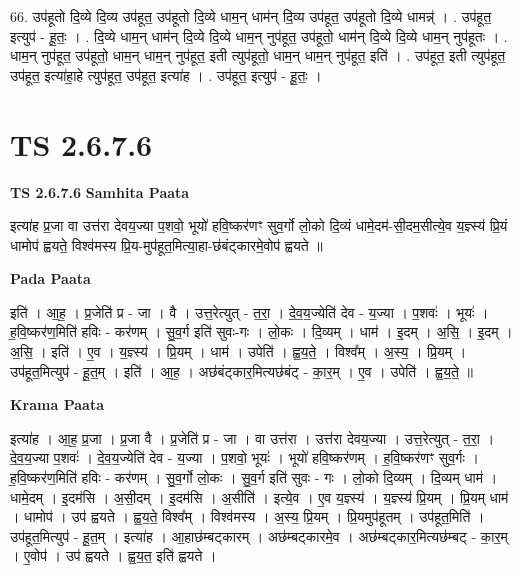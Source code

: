 \documentclass[17pt]{extarticle}
\begin{document}
66. उप॑हूतो दि॒व्ये दि॒व्य उप॑हूत॒ उप॑हूतो दि॒व्ये धाम॒न् धाम॑न् दि॒व्य उप॑हूत॒ उप॑हूतो दि॒व्ये धामन्न्॑ । . उप॑हूत॒ इत्युप॑ - हू॒तः॒ । . दि॒व्ये धाम॒न् धाम॑न् दि॒व्ये दि॒व्ये धाम॒न् नुप॑हूत॒ उप॑हूतो॒ धाम॑न् दि॒व्ये दि॒व्ये धाम॒न् नुप॑हूतः । . धाम॒न् नुप॑हूत॒ उप॑हूतो॒ धाम॒न् धाम॒न् नुप॑हूत॒ इती त्युप॑हूतो॒ धाम॒न् धाम॒न् नुप॑हूत॒ इति॑ । . उप॑हूत॒ इती त्युप॑हूत॒ उप॑हूत॒ इत्या॑हा॒हे त्युप॑हूत॒ उप॑हूत॒ इत्या॑ह । . उप॑हूत॒ इत्युप॑ - हू॒तः॒ । \newline
\pagebreak
{}

\section{ TS 2.6.7.6 }

\textbf{TS 2.6.7.6 } \newline
\textbf{Samhita Paata} \newline

इत्या॑ह प्र॒जा वा उत्त॑रा देवय॒ज्या प॒शवो॒ भूयो॑ हवि॒ष्कर॑णꣳ सुव॒र्गो लो॒को दि॒व्यं धामे॒दम॑-सी॒दम॒सीत्ये॒व य॒ज्ञ्स्य॑ प्रि॒यं धामोप॑ ह्वयते॒ विश्व॑मस्य प्रि॒य-मुप॑हूत॒मित्या॒हा-छ॑बंट्कारमे॒वोप॑ ह्वयते ॥ \newline

\textbf{Pada Paata} \newline

इति॑ । आ॒ह॒ । प्र॒जेति॑ प्र - जा । वै । उत्त॒रेत्युत् - त॒रा॒ । दे॒व॒य॒ज्येति॑ देव - य॒ज्या । प॒शवः॑ । भूयः॑ । ह॒वि॒ष्कर॑ण॒मिति॑ हविः - कर॑णम् । सु॒व॒र्ग इति॑ सुवः-गः । लो॒कः । दि॒व्यम् । धाम॑ । इ॒दम् । अ॒सि॒ । इ॒दम् । अ॒सि॒ । इति॑ । ए॒व । य॒ज्ञ्स्य॑ । प्रि॒यम् । धाम॑ । उपेति॑ । ह्व॒य॒ते॒ । विश्व᳚म् । अ॒स्य॒ । प्रि॒यम् । उप॑हूत॒मित्युप॑ - हू॒त॒म् । इति॑ । आ॒ह॒ । अछ॑बंट्कार॒मित्यछ॑बंट् - का॒र॒म् । ए॒व । उपेति॑ । ह्व॒य॒ते॒ ॥  \newline


\textbf{Krama Paata} \newline

इत्या॑ह । आ॒ह॒ प्र॒जा । प्र॒जा वै । प्र॒जेति॑ प्र - जा । वा उत्त॑रा । उत्त॑रा देवय॒ज्या । उत्त॒रेत्युत् - त॒रा॒ । दे॒व॒य॒ज्या प॒शवः॑ । दे॒व॒य॒ज्येति॑ देव - य॒ज्या । प॒शवो॒ भूयः॑ । भूयो॑ हवि॒ष्कर॑णम् । ह॒वि॒ष्कर॑णꣳ सुव॒र्गः । ह॒वि॒ष्कर॑ण॒मिति॑ हविः - कर॑णम् । सु॒व॒र्गो लो॒कः । सु॒व॒र्ग इति॑ सुवः - गः । लो॒को दि॒व्यम् । दि॒व्यम् धाम॑ । धामे॒दम् । इ॒दम॑सि । अ॒सी॒दम् । इ॒दम॑सि । अ॒सीति॑ । इत्ये॒व । ए॒व य॒ज्ञ्स्य॑ । य॒ज्ञ्स्य॑ प्रि॒यम् । प्रि॒यम् धाम॑ । धामोप॑ । उप॑ ह्वयते । ह्व॒य॒ते॒ विश्व᳚म् । विश्व॑मस्य । अ॒स्य॒ प्रि॒यम् । प्रि॒यमुप॑हूतम् । उप॑हूत॒मिति॑ । उप॑हूत॒मित्युप॑ - हू॒त॒म् । इत्या॑ह । आ॒हाछ॑म्बट्कारम् । अछ॑म्बट्कारमे॒व । अछ॑म्बट्कार॒मित्यछ॑म्बट् - का॒र॒म् । ए॒वोप॑ । उप॑ ह्वयते । ह्व॒य॒त॒ इति॑ ह्वयते । \newline
\end{document}
